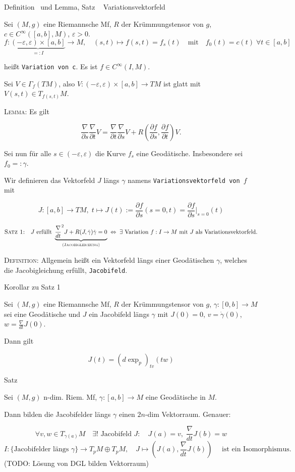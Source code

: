 \documentclass[a6paper,11pt,grid=front]{kartei}
\newcommand{\fl}[1]{\begin{flushleft}
 #1 \end{flushleft}}
\newcommand{\eps}{\varepsilon}
\newcommand{\nabladt}[1][t]{\frac{\nabla}{d#1}}
\newcommand{\nablapt}[1][t]{\frac{\nabla}{\partial#1}}
\newcounter{def}
\newcounter{satz}
\newcommand{\thisdef}{\thedef\ \stepcounter{def}}
\newcommand{\thissatz}{\thesatz\ \stepcounter{satz}}
\begin{document}
\nonameyet
{Definition \thisdef und Lemma, Satz \thissatz} {\tiny Variationsvektorfeld}
{
	\scriptsize
	\vspace{-4em}
Sei $(M,g)$ eine Riemannsche Mf, $R$ der Krümmungstensor von $g$,
$c \in C^\infty([a,b],M)$, $\varepsilon > 0$.
\[
f: \underbrace{(-\varepsilon,\varepsilon) \times [a,b]}_{=: I} \to M,
\quad (s,t) \mapsto f(s,t) = f_s (t)
\quad \text{mit} \quad
f_0(t) = c(t) \; \forall t\in [a,b]
\]
\vspace{-2em}
\fl{heißt \texttt{Variation von c}. Es ist $f \in C^\infty(I,M)$.}
Sei $V \in \Gamma_f(TM)$, also $V: (-\eps,\eps) \times [a,b] \to TM$ ist
glatt mit 
$V(s,t) \in T_{f(s,t)}M$.

\fl{\textsc{Lemma:} Es gilt}
\vspace{-3em}
\[
\nablapt[s] \nablapt V 
= \nablapt \nablapt[s] V 
+ R(\frac{\partial f}{\partial s},\frac{\partial f}{\partial t}) V.
\]

Sei nun für alle $s\in (-\eps,\eps)$ die Kurve $f_s$ eine Geodätische. 
Insbesondere sei $f_0 =: \gamma$.
\fl{Wir definieren das Vektorfeld $J$ längs $\gamma$ 
namens \texttt{Variationsvektorfeld von $f$} mit}
\[
J : [a,b] \to TM, \; 
t \mapsto J(t) := \frac{\partial f}{\partial s} (s=0,t)
= \frac{\partial f}{\partial s}|_{s=0} (t) 
\]

\vspace{-2em}
\[
\text{\textsc{Satz 1:}} \quad 
J  \text{ erfüllt }
\underbrace{\nabladt^2 J + R(J,\dot \gamma) \dot \gamma = 0}
_{\text{\textsc{(Jacobigleichung)}}}
\; \Leftrightarrow \;
\exists \text{ Variation } f: I \to M \text { mit $J$ als Variationsvektorfeld.} 
\]

\fl{\textsc{Definition:} Allgemein heißt ein Vektorfeld längs einer Geodätischen
$\gamma$, welches
die Jacobigleichung erfüllt, \texttt{Jacobifeld}.}
}
{}

\nonameyet
{Korollar zu Satz 1} {}
{
\small
Sei $(M,g)$ eine Riemannsche Mf, $R$ der Krümmungstensor von $g$, 
$\gamma : [0,b] \to M$ sei eine Geodätische und 
$J$ ein Jacobifeld längs $\gamma$ mit $J(0) = 0$, $v = \dot \gamma(0)$,
$w = \nabladt J (0)$.
\fl{Dann gilt}
\[
J(t) = (d \exp_p)_{tv}(tw)
\]
}
{}
\nonameyet
{Satz \thissatz} {}
{
	\small 
Sei $(M,g)$ n-dim. Riem. Mf, $\gamma : [a,b] \to M$ eine Geodätische in $M$.
\fl{Dann bilden die Jacobifelder längs $\gamma$ einen $2n$-dim Vektorraum.
Genauer:}
\[
\forall v,w \in T_{\gamma(a)}M \quad \exists ! \text{ Jacobifeld } J: 
\quad J(a) =  v ,\; \nabladt J (b) = w
\]
\[
I : \{\text{Jacobifelder längs $\gamma$}\} \to T_pM \oplus T_pM,
\quad J \mapsto (J(a),\nabladt J(b)) 
\quad \text{ ist ein Isomorphismus}.
\]
(TODO: Lösung von DGL bilden Vektorraum)
}
{}
\end{document}
